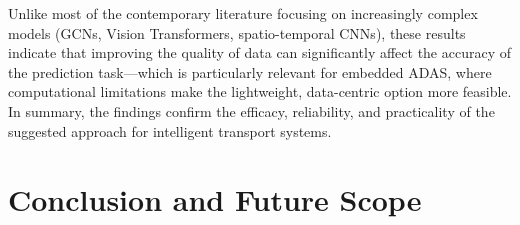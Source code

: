 \documentclass[conference]{IEEEtran}
\begin{document}
\begin{table}[t]
\centering
\small
\setlength{\tabcolsep}{4pt}
\renewcommand{\arraystretch}{1.2}
\caption{Cross-dataset generalisation summary. The same JAAD-trained pipeline is
evaluated across curated Western intent benchmarks, an unstructured Indian
perception benchmark, and a raw manually recorded video.}
\label{tab:generalization}
\end{table}

Unlike most of the contemporary literature focusing on increasingly complex
models (GCNs, Vision Transformers, spatio-temporal CNNs), these results indicate
that improving the quality of data can significantly affect the accuracy of the
prediction task---which is particularly relevant for embedded ADAS, where
computational limitations make the lightweight, data-centric option more
feasible. In summary, the findings confirm the efficacy, reliability, and
practicality of the suggested approach for intelligent transport systems.

\FloatBarrier


\section{Conclusion and Future Scope}
\end{document}
